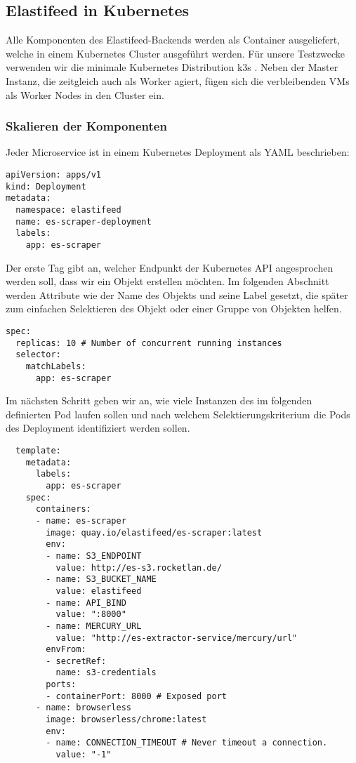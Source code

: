 \subsection{Elastifeed in Kubernetes}

Alle Komponenten des Elastifeed-Backends werden als Container ausgeliefert, welche in einem Kubernetes Cluster ausgeführt werden.
Für unsere Testzwecke verwenden wir die minimale Kubernetes Distribution k3s \cite{k3s}.
Neben der Master Instanz, die zeitgleich auch als Worker agiert, fügen sich die verbleibenden VMs als Worker Nodes in den Cluster ein.

\subsubsection{Skalieren der Komponenten}

Jeder Microservice ist in einem Kubernetes Deployment als YAML beschrieben:
\begin{lstlisting}
apiVersion: apps/v1
kind: Deployment
metadata:
  namespace: elastifeed
  name: es-scraper-deployment
  labels:
    app: es-scraper
\end{lstlisting}
Der erste Tag  gibt an, welcher Endpunkt der Kubernetes API angesprochen werden soll,  dass wir ein  Objekt erstellen möchten.
Im folgenden  Abschnitt werden Attribute wie der Name des Objekts und seine Label gesetzt, die später zum einfachen Selektieren des Objekt oder einer Gruppe von Objekten helfen.

\begin{lstlisting}
spec:
  replicas: 10 # Number of concurrent running instances
  selector:
    matchLabels:
      app: es-scraper
\end{lstlisting}

Im nächsten Schritt geben wir an, wie viele Instanzen des im folgenden definierten Pod laufen sollen und nach welchem Selektierungskriterium die Pods des Deployment identifiziert werden sollen.

\begin{lstlisting}
  template:
    metadata:
      labels:
        app: es-scraper
    spec:
      containers:
      - name: es-scraper
        image: quay.io/elastifeed/es-scraper:latest
        env:
        - name: S3_ENDPOINT
          value: http://es-s3.rocketlan.de/
        - name: S3_BUCKET_NAME
          value: elastifeed
        - name: API_BIND
          value: ":8000"
        - name: MERCURY_URL
          value: "http://es-extractor-service/mercury/url"
        envFrom:
        - secretRef:
          name: s3-credentials
        ports:
        - containerPort: 8000 # Exposed port
      - name: browserless
        image: browserless/chrome:latest
        env:
        - name: CONNECTION_TIMEOUT # Never timeout a connection.
          value: "-1"
\end{lstlisting}

